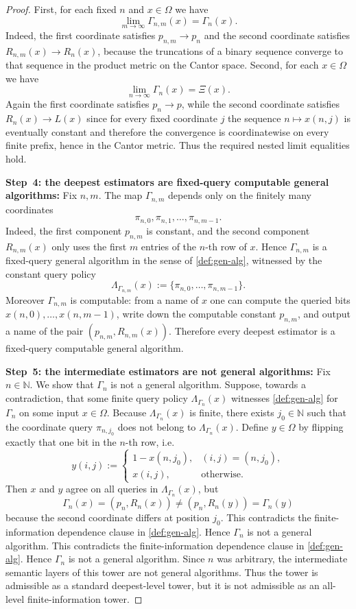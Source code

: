 \documentclass{lmcs} %
\theoremstyle{plain}
\theoremstyle{plain}
\theoremstyle{definition}
\theoremstyle{remark}
\theoremstyle{definition}
\theoremstyle{remark}
\numberwithin{equation}{section}
\begin{document}
\begin{proof}
	First, for each fixed $n$ and $x\in\Omega$ we have
	\[
	\lim_{m\to\infty}\Gamma_{n,m}(x)=\Gamma_n(x).
	\]
	Indeed, the first coordinate satisfies $p_{n,m}\to p_n$ and the second coordinate
	satisfies $R_{n,m}(x)\to R_n(x)$, because the truncations of a binary sequence converge to
	that sequence in the product metric on the Cantor space.
	Second, for each $x\in\Omega$ we have
	\[
	\lim_{n\to\infty}\Gamma_n(x)=\Xi(x).
	\]
	Again the first coordinate satisfies $p_n\to p$, while the second coordinate satisfies
	$R_n(x)\to L(x)$ since for every fixed coordinate $j$ the sequence $n\mapsto x(n,j)$ is
	eventually constant and therefore the convergence is coordinatewise on every finite
	prefix, hence in the Cantor metric.
	Thus the required nested limit equalities hold.
	
	\smallskip
	\noindent
	\textbf{Step~4: the deepest estimators are fixed-query computable general algorithms:}
	Fix $n,m$.  The map $\Gamma_{n,m}$ depends only on the finitely many coordinates
	\[
	\pi_{n,0},\pi_{n,1},\dots,\pi_{n,m-1}.
	\]
	Indeed, the first component $p_{n,m}$ is constant, and the second component
	$R_{n,m}(x)$ only uses the first $m$ entries of the $n$-th row of $x$.
	Hence $\Gamma_{n,m}$ is a fixed-query general algorithm in the sense of
	\cref{def:gen-alg}, witnessed by the constant query policy
	\[
	\Lambda_{\Gamma_{n,m}}(x):=\{\pi_{n,0},\dots,\pi_{n,m-1}\}.
	\]
	Moreover $\Gamma_{n,m}$ is computable: from a name of $x$ one can compute the queried
	bits $x(n,0),\dots,x(n,m-1)$, write down the computable constant $p_{n,m}$, and output a
	name of the pair $(p_{n,m},R_{n,m}(x))$.
	Therefore every deepest estimator is a fixed-query computable general algorithm.
	
	\smallskip
	\noindent
	\textbf{Step~5: the intermediate estimators are not general algorithms:}
	Fix $n\in\mathbb N$. We show that $\Gamma_n$ is not a general algorithm.
	Suppose, towards a contradiction, that some finite query policy
	$\Lambda_{\Gamma_n}(x)$ witnesses \cref{def:gen-alg} for $\Gamma_n$ on some input
	$x\in\Omega$.
	Because $\Lambda_{\Gamma_n}(x)$ is finite, there exists $j_0\in\mathbb N$ such that the
	coordinate query $\pi_{n,j_0}$ does not belong to $\Lambda_{\Gamma_n}(x)$.
	Define $y\in\Omega$ by flipping exactly that one bit in the $n$-th row, i.e.
	\[
	y(i,j):=
	\begin{cases}
		1-x(n,j_0), & (i,j)=(n,j_0),\\
		x(i,j), & \text{otherwise.}
	\end{cases}
	\]
	Then $x$ and $y$ agree on all queries in $\Lambda_{\Gamma_n}(x)$, but
	\[
	\Gamma_n(x)=(p_n,R_n(x))\neq (p_n,R_n(y))=\Gamma_n(y)
	\]
	because the second coordinate differs at position $j_0$.
	This contradicts the finite-information dependence clause in \cref{def:gen-alg}.
	Hence $\Gamma_n$ is not a general algorithm. This contradicts the finite-information dependence clause in
\cref{def:gen-alg}. Hence \(\Gamma_n\) is not a general algorithm.
Since \(n\) was arbitrary, the intermediate semantic layers of this tower are not general
algorithms. Thus the tower is admissible as a standard deepest-level tower, but it is not
admissible as an all-level finite-information tower.
	

\end{proof}
\end{document}
